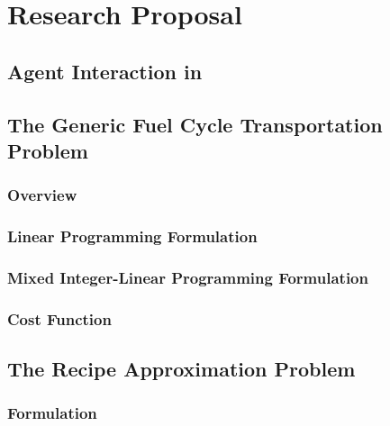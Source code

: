 \chapter{Research Proposal}\label{ch:research}



\section{Agent Interaction in \Cyclus}\label{sec:agent-interaction}


\section{The Generic Fuel Cycle Transportation Problem}\label{sec:gfctp}

\subsection{Overview}



\subsection{Linear Programming Formulation}



\subsection{Mixed Integer-Linear Programming Formulation}



\subsection{Cost Function}\label{sec:cost-function}



\section{The Recipe Approximation Problem}\label{sec:rap}



\subsection{Formulation}

